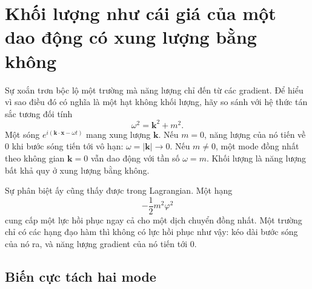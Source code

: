 \begin{classroomqa}
\end{classroomqa}

\section{Khối lượng như cái giá của một dao động có xung lượng bằng không}

Sự xoắn trơn bộc lộ một trường mà năng lượng chỉ đến từ các gradient. Để hiểu vì sao điều đó có nghĩa là một hạt không khối lượng, hãy so sánh với hệ thức tán sắc tương đối tính
\begin{equation}
  \omega^2=\bm{k}^2+m^2.
  \label{eq:l07-dispersion}
\end{equation}
Một sóng \(e^{i(\bm{k}\cdot\bm{x}-\omega t)}\) mang xung lượng \(\bm{k}\).
Nếu \(m=0\), năng lượng của nó tiến về 0 khi bước sóng tiến tới vô hạn:
\(\omega=|\bm{k}|\to0\). Nếu \(m\ne0\), một mode đồng nhất theo không gian
\(\bm{k}=0\) vẫn dao động với tần số \(\omega=m\). Khối lượng là năng lượng bất khả quy ở xung lượng bằng không.

Sự phân biệt ấy cũng thấy được trong Lagrangian. Một hạng
\begin{equation}
  -\frac12m^2\varphi^2
\end{equation}
cung cấp một lực hồi phục ngay cả cho một dịch chuyển đồng nhất. Một trường chỉ có các hạng đạo hàm thì không có lực hồi phục như vậy: kéo dài bước sóng của nó ra, và năng lượng gradient của nó tiến tới 0.

\subsection{Biến cực tách hai mode}

